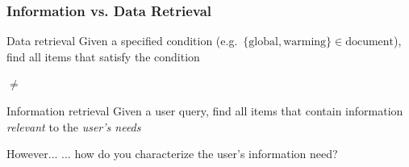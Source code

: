 \documentclass[svgnames]{beamer}
\begin{document}




\begin{frame}
    \frametitle{Information vs. Data Retrieval}

    \begin{block}{Data retrieval}
        Given a specified condition (e.g.~$\{\text{global}, \text{warming}\} \in
        \text{document}$), find all items that satisfy the condition
    \end{block}

    \begin{center}
        {\Huge $\neq$}
    \end{center}

    \begin{block}{Information retrieval}
        Given a user query, find all items that contain information
        \emph{relevant} to the \emph{user's needs}
    \end{block}

    \pause

    \begin{block}{However...}
        ... how do you characterize the \alert{user's information need}?
    \end{block}


\end{frame}

\end{document}
